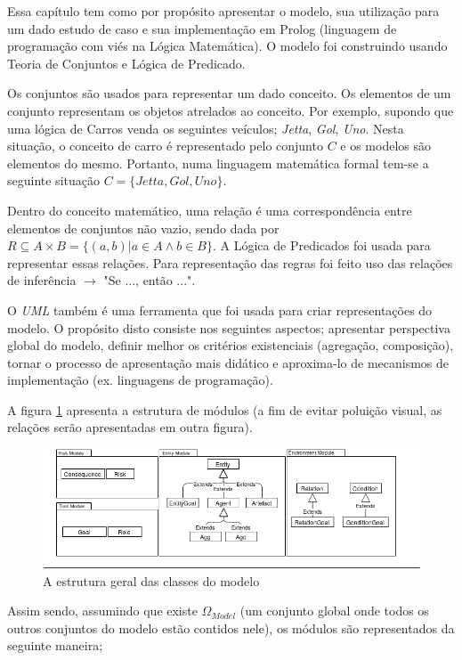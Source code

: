 Essa capítulo tem como por propósito apresentar o modelo, sua utilização para um dado estudo de caso e sua implementação 
em Prolog (linguagem de programação com viés na Lógica Matemática). O modelo foi construindo usando Teoria de Conjuntos
e Lógica de Predicado.

Os conjuntos são usados para representar um dado conceito. Os elementos de um conjunto representam os objetos atrelados ao 
conceito. Por exemplo, supondo que uma lógica de Carros venda os seguintes veículos; \textit{Jetta}, \textit{Gol}, \textit{Uno}.
Nesta situação, o conceito de carro é representado pelo conjunto $C$ e os modelos são elementos do mesmo. Portanto, numa linguagem
matemática formal tem-se a seguinte situação $C = \{Jetta,Gol,Uno\}$. 

Dentro do conceito matemático, uma relação é uma correspondência entre elementos de conjuntos não vazio, sendo dada por
$R \subseteq  A \times B = \{(a,b)| a \in A \wedge b \in B \}$. A Lógica de Predicados foi usada para representar essas
relações. Para representação das regras foi feito uso das relações de inferência $\rightarrow$ "Se ..., então ...".  

O \textit{UML} também é uma ferramenta que foi usada para criar representações do modelo. O propósito disto consiste nos
seguintes aspectos; apresentar perspectiva global do modelo, definir melhor os critérios existenciais (agregação, composição),
tornar o processo de apresentação mais didático e aproxima-lo de mecanismos de implementação (ex. linguagens de programação). 

A figura \ref{module} apresenta a estrutura de módulos (a fim de evitar poluição visual, as relações serão apresentadas
em outra figura). 

\begin{figure}[H]
  \centering
  \includegraphics[width=1\linewidth]{figure/Module.png} 
  \caption{A estrutura geral das classes do modelo}
  \label{module}
\end{figure}

Assim sendo, assumindo que existe $\Omega_{Model}$ (um conjunto global onde todos os outros conjuntos do modelo estão 
contidos nele), os módulos são representados da seguinte maneira; 

